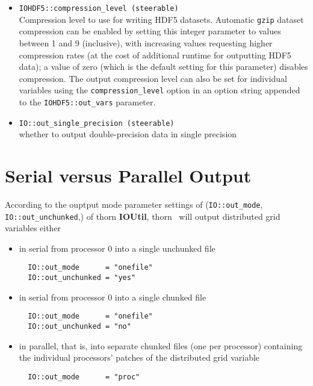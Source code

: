 \documentclass{article}
\begin{document}
\begin{itemize}
  \item {\tt IOHDF5::compression\_level (steerable)}\\
        Compression level to use for writing HDF5 datasets.
        Automatic {\tt gzip} dataset compression can be enabled by setting
        this integer parameter to values between 1 and 9 (inclusive),
        with increasing values requesting higher compression rates (at the cost
        of additional runtime for outputting HDF5 data); a value of zero
        (which is the default setting for this parameter) disables compression.
        The output compression level can also be set
        for individual variables using the {\tt compression\_level} option in
        an option string appended to the {\tt IOHDF5::out\_vars} parameter.

  \item {\tt IO::out\_single\_precision (steerable)}\\
        whether to output double-precision data in single precision

\end{itemize}


\section{Serial versus Parallel Output}

According to the ouptput mode parameter settings of ({\tt IO::out\_mode},
{\tt IO::out\_unchunked},) of thorn
{\bf IOUtil}, thorn \ThisThorn\ will output distributed grid variables either

\begin{itemize}
  \item in serial from processor 0 into a single unchunked file
\begin{verbatim}
  IO::out_mode      = "onefile"
  IO::out_unchunked = "yes"
\end{verbatim}

  \item in serial from processor 0 into a single chunked file
\begin{verbatim}
  IO::out_mode      = "onefile"
  IO::out_unchunked = "no"
\end{verbatim}

  \item in parallel, that is, into separate chunked files (one per processor)
        containing the individual processors' patches of the
        distributed grid variable
\begin{verbatim}
  IO::out_mode      = "proc"
\end{verbatim}
\end{itemize}
\end{document}
